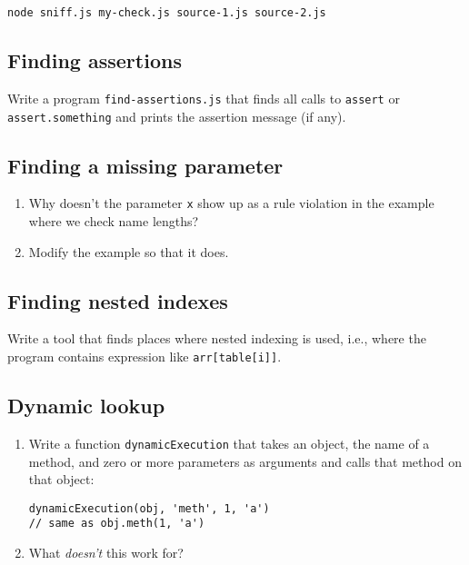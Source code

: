 \documentclass[krantzl]{krantz}
\begin{document}
\begin{lstlisting}[frame=shadowbox]
node sniff.js my-check.js source-1.js source-2.js
\end{lstlisting}


\subsection*{Finding assertions}


Write a program \texttt{find-assertions.js} that finds all calls to \texttt{assert} or \texttt{assert.something}
and prints the assertion message (if any).

\subsection*{Finding a missing parameter}

\begin{enumerate}

\item 

Why doesn’t the parameter \texttt{x} show up as a rule violation
    in the example where we check name lengths?



\item 

Modify the example so that it does.



\end{enumerate}

\subsection*{Finding nested indexes}


Write a tool that finds places where nested indexing is used,
i.e.,
where the program contains expression like \texttt{arr[table[i]]}.

\subsection*{Dynamic lookup}

\begin{enumerate}

\item 

Write a function \texttt{dynamicExecution} that takes an object,
    the name of a method,
    and zero or more parameters as arguments
    and calls that method on that object:

\begin{lstlisting}[frame=tblr]
dynamicExecution(obj, 'meth', 1, 'a')
// same as obj.meth(1, 'a')
\end{lstlisting}



\item 

What \emph{doesn’t} this work for?



\end{enumerate}
\end{document}
